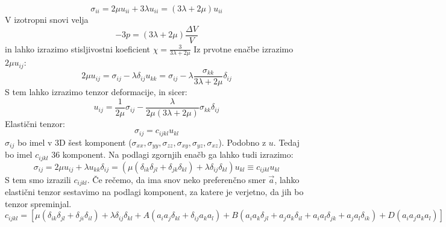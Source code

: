 \documentclass[a4paper]{article}
\newcommand{\vct}[1]{\overrightarrow{#1}}
\begin{document}
$$\sigma_{ii} = 2\mu u_{ii} + 3\lambda u_{ii} = (3\lambda + 2\mu)u_{ii}$$
V izotropni snovi velja
$$-3p = \left(3\lambda + 2\mu\right)\frac{\Delta V}{V}$$
in lahko izrazimo stisljivostni koeficient $\displaystyle{\chi = \frac{3}{3\lambda + 2\mu}}$
Iz prvotne enačbe izrazimo $\displaystyle{2\mu u_{ij}}$:
$$2\mu u_{ij} = \sigma_{ij} - \lambda \delta_{ij}u_{kk} = \sigma_{ij} - \lambda\frac{\sigma_{kk}}{3\lambda + 2\mu}\delta_{ij}$$
S tem lahko izrazimo tenzor deformacije, in sicer:
$$u_{ij} = \frac{1}{2\mu}\sigma_{ij} - \frac{\lambda}{2\mu \left(3\lambda + 2\mu\right)}\sigma_{kk} \delta_{ij}$$
Elastični tenzor:
$$\sigma_{ij} = c_{ijkl} u_{kl}$$
$\sigma_{ij}$ bo imel v 3D šest komponent ($\sigma_{xx}, \sigma_{yy}, \sigma_{zz}, \sigma_{xy}, \sigma_{yz}, \sigma_{xz}$). Podobno z $u$. Tedaj bo imel $c_{ijkl}$ 36 komponent. Na podlagi zgornjih enačb ga lahko tudi izrazimo:
$$\sigma_{ij} = 2\mu u_{ij} + \lambda u_{kk} \delta_{ij} = \left(\mu(\delta_{ik} \delta_{jl} + \delta_{jk} \delta_{kl}) + \lambda \delta_{ij}\delta_{kl}\right)u_{kl} \equiv c_{ijkl} u_{kl}$$
S tem smo izrazili $c_{ijkl}$. Če rečemo, da ima snov neko preferenčno smer $\vct{a}$, lahko elastični tenzor sestavimo na podlagi komponent, za katere je verjetno, da jih bo tenzor spreminjal.
$$c_{ijkl} = \left[\mu(\delta_{ik}\delta_{jl} + \delta_{ji}\delta_{il}) + \lambda\delta_{ij}\delta_{kl} + A(a_ia_j\delta_{kl} + \delta_{ij}a_ka_l) + B(a_ia_k\delta_{jl} + a_ja_k\delta_{il} + a_ia_l\delta_{jk} + a_ja_l\delta_{ik}) + D(a_ia_ja_ka_l)\right]$$
\end{document}
